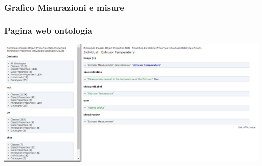 \documentclass{beamer}
\begin{document}
\begin{frame}
\frametitle{Grafico Misurazioni e misure}
\begin{figure}%
{}%
\hfill
{}%
%
%
\end{figure}
\end{frame}



\begin{frame}
\frametitle{Pagina web ontologia}
\includegraphics[width=1\textwidth]{images/ExtrusorTemperature2.png}
\end{frame}
\end{document}
